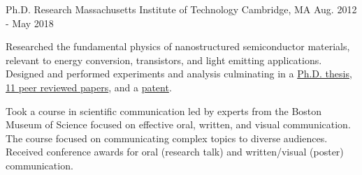 \begin{cventries}
  \cventry
    {Ph.D. Research} %
    {Massachusetts Institute of Technology} %
    {Cambridge, MA} %
    {Aug. 2012 - May 2018} %
    {
      \begin{cvitems} %
        \item {
            Researched the fundamental physics of nanostructured
            semiconductor materials, relevant to energy conversion,
            transistors, and light emitting applications. Designed
            and performed experiments and analysis culminating
            in a
            \href{https://dspace.mit.edu/handle/1721.1/118263}{Ph.D. thesis},
            \href{https://scholar.google.com/citations?user=5-TA9cAAAAAJ}{11 peer reviewed papers},
            and a \href{https://patents.google.com/patent/US10855046B2/en}{patent}.
        }
        \item {
            Took a course in scientific communication led by
            experts from the Boston Museum of Science focused on
            effective oral, written, and visual communication.
            The course focused on communicating complex topics
            to diverse audiences. Received conference awards for oral (research talk) and written/visual (poster) communication.
        }
      \end{cvitems}
    }
\end{cventries}
